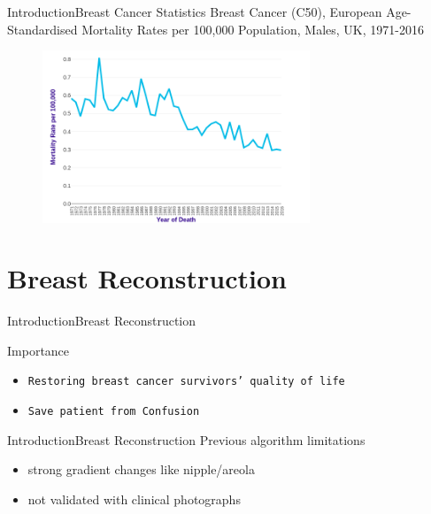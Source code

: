 \documentclass[10pt]{beamer}
\begin{document}
\begin{frame}{Introduction}{Breast Cancer Statistics} 
Breast Cancer (C50), European Age-Standardised Mortality Rates per 100,000 Population, Males, UK, 1971-2016
\begin{figure}[t]
	\includegraphics[width=8cm]{Feathergraphics/plot2}
	\centering
\end{figure}
\end{frame}
\section{Breast Reconstruction}
\begin{frame}{Introduction}{Breast Reconstruction} 
\begin{block}{}
	Importance
	\begin{itemize}
		\item {\tt Restoring breast cancer survivors' quality of life}
		\item {\tt Save patient from Confusion}
	\end{itemize}
\end{block}
\end{frame}


\begin{frame}{Introduction}{Breast Reconstruction} 
Previous algorithm limitations
\begin{itemize}
	\item<2- > strong gradient changes like nipple/areola 
	\item<3- > not validated with clinical photographs 
\end{itemize}
\end{frame}
\end{document}
